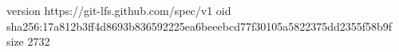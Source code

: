 version https://git-lfs.github.com/spec/v1
oid sha256:17a812b3ff4d8693b836592225ea6beeebcd77f30105a5822375dd2355f58b9f
size 2732
